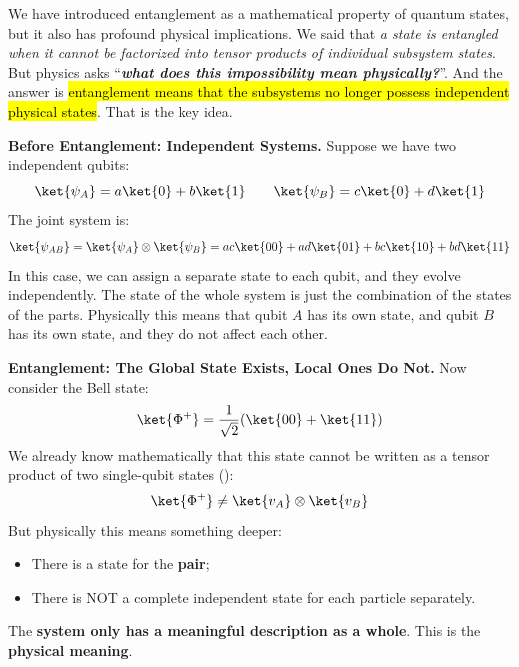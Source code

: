 \highspace
\begin{deepeningbox}\label{deepening:physical-meaning-of-entanglement}
    We have introduced entanglement as a mathematical property of quantum states, but it also has profound physical implications. We said that \emph{a state is entangled when it cannot be factorized into tensor products of individual subsystem states}. But physics asks ``\emph{\textbf{what does this impossibility mean physically?}}''. And the answer is \hl{entanglement means that the subsystems no longer possess independent physical states}. That is the key idea.

    \highspace
    \textcolor{Green3}{ \textbf{Before Entanglement: Independent Systems.}} Suppose we have two independent qubits:
    \begin{equation*}
        \ket{\psi_A} = a\ket{0} + b\ket{1}
        \qquad
        \ket{\psi_B} = c\ket{0} + d\ket{1}
    \end{equation*}
    The joint system is:
    \begin{equation*}
        \ket{\psi_{AB}} = \ket{\psi_A} \otimes \ket{\psi_B} = ac\ket{00} + ad\ket{01} + bc\ket{10} + bd\ket{11}
    \end{equation*}
    In this case, we can assign a separate state to each qubit, and they evolve independently. The state of the whole system is just the combination of the states of the parts. Physically this means that qubit $A$ has its own state, and qubit $B$ has its own state, and they do not affect each other.

    \highspace
    \textcolor{Green3}{ \textbf{Entanglement: The Global State Exists, Local Ones Do Not.}} Now consider the Bell state:
    \begin{equation*}
        \ket{\Phi^+} = \frac{1}{\sqrt{2}}(\ket{00} + \ket{11})
    \end{equation*}
    We already know mathematically that this state cannot be written as a tensor product of two single-qubit states ():
    \begin{equation*}
        \ket{\Phi^+} \neq \ket{v_A} \otimes \ket{v_B}
    \end{equation*}
    But physically this means something deeper:
    \begin{itemize}
        \item There is a state for the \textbf{pair};
        \item There is NOT a complete independent state for each particle separately.
    \end{itemize}
    The \textbf{system only has a meaningful description as a whole}. This is the \textbf{physical meaning}.


\end{deepeningbox}
